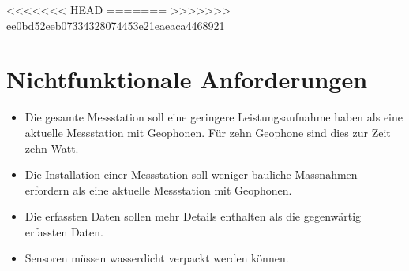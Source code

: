 %
<<<<<<< HEAD
=======
>>>>>>> ee0bd52eeb07334328074453e21eaeaca4468921
%

\thispagestyle{empty}
\chapter{Nichtfunktionale Anforderungen}\label{chap.nichtfunktionale}

\begin{itemize}
\item Die gesamte Messstation soll eine geringere Leistungsaufnahme haben als eine aktuelle Messstation mit Geophonen. Für zehn Geophone sind dies zur Zeit zehn Watt.
\item Die Installation einer Messstation soll weniger bauliche Massnahmen erfordern als eine aktuelle Messstation mit Geophonen.
\item Die erfassten Daten sollen mehr Details enthalten als die gegenwärtig erfassten Daten.
\item Sensoren müssen wasserdicht verpackt werden können.
\
\end{itemize}